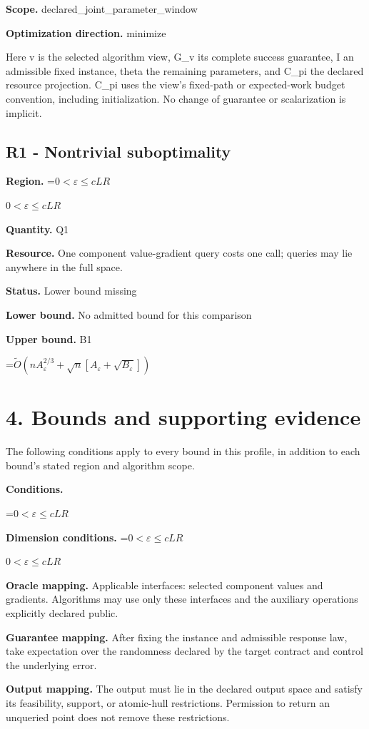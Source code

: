 \documentclass[10pt,a4paper]{article}
\newcommand{\AtlasMath}[1]{\par\begingroup\centering\setbox0=\hbox{$\displaystyle #1$}\ifdim\wd0>1.4\linewidth\typeout{ATLAS WIDE FORMULA: \the\wd0}\fi\ifdim\wd0>\linewidth\resizebox{\linewidth}{!}{\box0}\else\box0\fi\par\endgroup}
\newcommand{\AtlasInlineMath}[1]{\begingroup\setbox0=\hbox{$#1$}\ifdim\wd0>.4\linewidth\endgroup\AtlasMath{#1}\else\endgroup$#1$\fi}
\begin{document}
\textbf{Scope.} declared\_joint\_parameter\_window

\textbf{Optimization direction.} minimize

Here v is the selected algorithm view, G\_v its complete success guarantee, I an admissible fixed instance, theta the remaining parameters, and C\_pi the declared resource projection. C\_pi uses the view's fixed-path or expected-work budget convention, including initialization. No change of guarantee or scalarization is implicit.

\subsection{R1 - Nontrivial suboptimality}
\textbf{Region.} \AtlasInlineMath{0<\varepsilon\le cLR}

\textbf{Quantity.} Q1

\textbf{Resource.} One component value-gradient query costs one call; queries may lie anywhere in the full space.

\textbf{Status.} Lower bound missing

\textbf{Lower bound.} No admitted bound for this comparison

\textbf{Upper bound.} B1

\AtlasMath{\widetilde{O}(nA_\varepsilon^{2/3}+\sqrt n[A_\varepsilon+\sqrt{B_\varepsilon}])}
\section{4. Bounds and supporting evidence}
The following conditions apply to every bound in this profile, in addition to each bound's stated region and algorithm scope.

\textbf{Conditions.} 
\AtlasMath{0<\varepsilon\le cLR}


\textbf{Dimension conditions.} \AtlasInlineMath{0<\varepsilon\le cLR}

\textbf{Oracle mapping.} Applicable interfaces: selected component values and gradients. Algorithms may use only these interfaces and the auxiliary operations explicitly declared public.

\textbf{Guarantee mapping.} After fixing the instance and admissible response law, take expectation over the randomness declared by the target contract and control the underlying error.

\textbf{Output mapping.} The output must lie in the declared output space and satisfy its feasibility, support, or atomic-hull restrictions. Permission to return an unqueried point does not remove these restrictions.
\end{document}
